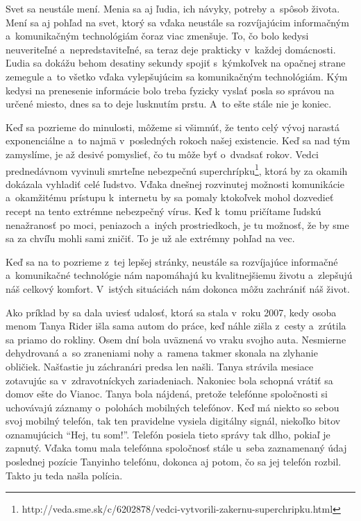 \newpage

Svet sa neustále mení. Menia sa aj ľudia, ich návyky, potreby a~spôsob života. Mení sa aj pohľad na svet, ktorý sa vďaka neustále sa rozvíjajúcim informačným a~komunikačným technológiám čoraz viac zmenšuje. To, čo bolo kedysi neuveriteľné a~nepredstaviteľné, sa teraz deje prakticky v~každej domácnosti. Ľudia sa dokážu behom desatiny sekundy spojiť s~kýmkoľvek na opačnej strane zemegule a~to všetko vďaka vylepšujúcim sa komunikačným technológiám. Kým kedysi na prenesenie informácie bolo treba fyzicky vyslať posla so správou na určené miesto, dnes sa to deje lusknutím prstu. A~to ešte stále nie je koniec.

Keď sa pozrieme do minulosti, môžeme si všimnúť, že tento celý vývoj narastá exponenciálne a~to najmä v~posledných rokoch našej existencie. Keď sa nad tým zamyslíme, je až desivé pomyslieť, čo tu môže byť o~dvadsať rokov. Vedci prednedávnom vyvinuli smrteľne nebezpečnú superchrípku\footnote{http://veda.sme.sk/c/6202878/vedci-vytvorili-zakernu-superchripku.html}, ktorá by za okamih dokázala vyhladiť celé ľudstvo. Vďaka dnešnej rozvinutej možnosti komunikácie a~okamžitému prístupu k~internetu by sa pomaly ktokoľvek mohol dozvedieť recept na tento extrémne nebezpečný vírus. Keď k~tomu pričítame ľudskú nenažranosť po moci, peniazoch a~iných prostriedkoch, je tu možnosť, že by sme sa za chvíľu mohli sami zničiť. To je už ale extrémny pohľad na vec.

Keď sa na to pozrieme z~tej lepšej stránky, neustále sa rozvíjajúce informačné a~komunikačné technológie nám napomáhajú ku kvalitnejšiemu životu a~zlepšujú náš celkový komfort. V~istých situáciách nám dokonca môžu zachrániť náš život.

Ako príklad by sa dala uviesť udalosť, ktorá sa stala v~roku 2007, kedy osoba menom Tanya Rider išla sama autom do práce, keď náhle zišla z~cesty a~zrútila sa priamo do rokliny. Osem dní bola uväznená vo vraku svojho auta. Nesmierne dehydrovaná a~so zraneniami nohy a~ramena takmer skonala na zlyhanie obličiek. Našťastie ju záchranári predsa len našli. Tanya strávila mesiace zotavujúc sa v~zdravotníckych zariadeniach. Nakoniec bola schopná vrátiť sa domov ešte do Vianoc. Tanya bola nájdená, pretože telefónne spoločnosti si uchovávajú záznamy o~polohách mobilných telefónov. Keď má niekto so sebou svoj mobilný telefón, tak ten pravidelne vysiela digitálny signál, niekoľko bitov oznamujúcich ``Hej, tu som!''. Telefón posiela tieto správy tak dlho, pokiaľ je zapnutý. Vďaka tomu mala telefónna spoločnosť stále u~seba zaznamenaný údaj poslednej pozície Tanyinho telefónu, dokonca aj potom, čo sa jej telefón rozbil. Takto ju teda našla polícia.\cite{B2B}

